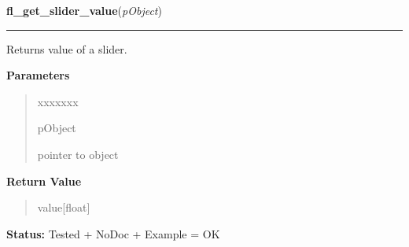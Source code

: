 \hspace{.8\funcindent}\begin{boxedminipage}{\funcwidth}

    \raggedright \textbf{fl\_get\_slider\_value}(\textit{pObject})

    \vspace{-1.5ex}

    \rule{\textwidth}{0.5\fboxrule}
\setlength{\parskip}{2ex}
    Returns value of a slider.

\setlength{\parskip}{1ex}
      \textbf{Parameters}
      \vspace{-1ex}

      \begin{quote}
        \begin{Ventry}{xxxxxxx}

          \item[pObject]

          pointer to object

        \end{Ventry}

      \end{quote}

      \textbf{Return Value}
    \vspace{-1ex}

      \begin{quote}
      value[float]

      \end{quote}

\textbf{Status:} Tested + NoDoc + Example = OK



    \end{boxedminipage}

    \label{xformslib:library:fl_set_slider_bounds}

    \vspace{0.5ex}

